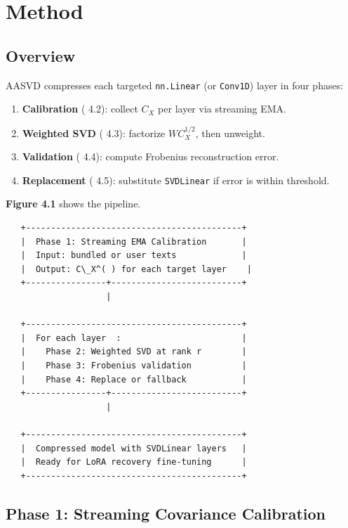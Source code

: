 
\section{Method}

\subsection{Overview}

AASVD compresses each targeted \texttt{nn.Linear} (or \texttt{Conv1D}) layer in four phases:

\begin{enumerate}
\item \textbf{Calibration} ( 4.2): collect $C_X$ per layer via streaming EMA.
\item \textbf{Weighted SVD} ( 4.3): factorize $W C_X^{1/2}$, then unweight.
\item \textbf{Validation} ( 4.4): compute Frobenius reconstruction error.
\item \textbf{Replacement} ( 4.5): substitute \texttt{SVDLinear} if error is within threshold.

\end{enumerate}
\textbf{Figure 4.1} shows the pipeline.

\begin{lstlisting}
   +-------------------------------------------+
   |  Phase 1: Streaming EMA Calibration       |
   |  Input: bundled or user texts             |
   |  Output: C\_X^( ) for each target layer    |
   +----------------+--------------------------+
                    |
                     
   +-------------------------------------------+
   |  For each layer  :                        |
   |    Phase 2: Weighted SVD at rank r        |
   |    Phase 3: Frobenius validation          |
   |    Phase 4: Replace or fallback           |
   +----------------+--------------------------+
                    |
                     
   +-------------------------------------------+
   |  Compressed model with SVDLinear layers   |
   |  Ready for LoRA recovery fine-tuning      |
   +-------------------------------------------+
\end{lstlisting}

\subsection{Phase 1: Streaming Covariance Calibration}

